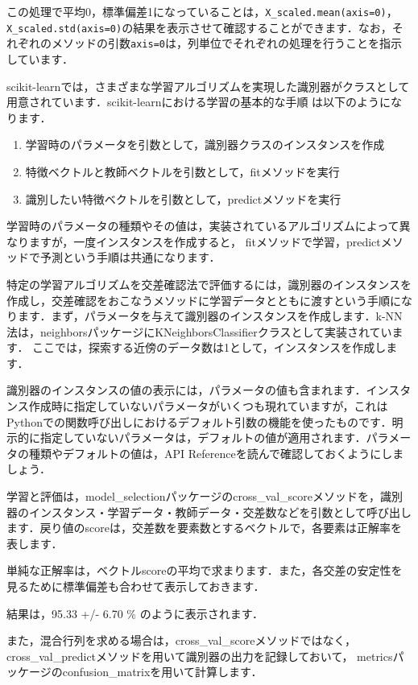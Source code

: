 この処理で平均0，標準偏差1になっていることは，\texttt{X\_scaled.mean(axis=0)}，\texttt{X\_scaled.std(axis=0)}の結果を表示させて確認することができます．なお，それぞれのメソッドの引数\texttt{axis=0}は，列単位でそれぞれの処理を行うことを指示しています．

scikit-learnでは，さまざまな学習アルゴリズムを実現した識別器がクラスとして用意されています．scikit-learnにおける学習の基本的な手順
は以下のようになります．
\begin{enumerate}
\item 学習時のパラメータを引数として，識別器クラスのインスタンスを作成
\item 特徴ベクトルと教師ベクトルを引数として，fitメソッドを実行
\item 識別したい特徴ベクトルを引数として，predictメソッドを実行
\end{enumerate}

学習時のパラメータの種類やその値は，実装されているアルゴリズムによって異なりますが，一度インスタンスを作成すると，
fitメソッドで学習，predictメソッドで予測という手順は共通になります．

特定の学習アルゴリズムを交差確認法で評価するには，識別器のインスタンスを作成し，交差確認をおこなうメソッドに学習データとともに渡すという手順になります．まず，パラメータを与えて識別器のインスタンスを作成します．k-NN法は，neighborsパッケージにKNeighborsClassifierクラスとして実装されています．
ここでは，探索する近傍のデータ数は1として，インスタンスを作成します．

識別器のインスタンスの値の表示には，パラメータの値も含まれます．インスタンス作成時に指定していないパラメータがいくつも現れていますが，これはPythonでの関数呼び出しにおけるデフォルト引数の機能を使ったものです．明示的に指定していないパラメータは，デフォルトの値が適用されます．パラメータの種類やデフォルトの値は，API Referenceを読んで確認しておくようにしましょう．

学習と評価は，model\_selectionパッケージのcross\_val\_scoreメソッドを，識別器のインスタンス・学習データ・教師データ・交差数などを引数として呼び出します．戻り値のscoreは，交差数を要素数とするベクトルで，各要素は正解率を表します．

単純な正解率は，ベクトルscoreの平均で求まります．また，各交差の安定性を見るために標準偏差も合わせて表示しておきます．

結果は，95.33 +/- 6.70 \% のように表示されます．

また，混合行列を求める場合は，cross\_val\_scoreメソッドではなく，cross\_val\_predictメソッドを用いて識別器の出力を記録しておいて，
metricsパッケージのconfusion\_matrixを用いて計算します．


